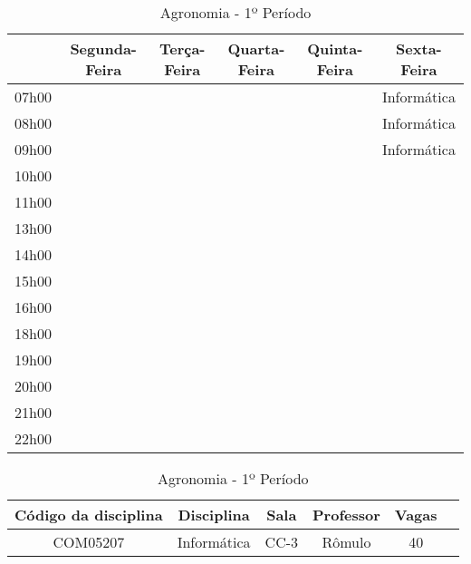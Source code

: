 \begin{apendices}
\begin{table}[!h]
\begin{adjustbox}{width=1\textwidth,center=\textwidth}
\centering
\begin{tabular}{|c|c|c|c|c|c|}
\hline
 & Segunda-Feira & Terça-Feira & Quarta-Feira & Quinta-Feira & Sexta-Feira \\ \hline
07h00 &  &  &  &  & Informática \\ \hline
08h00 &  &  &  &  & Informática \\ \hline
09h00 &  &  &  &  & Informática \\ \hline
10h00 &  &  &  &  &  \\ \hline
11h00 &  &  &  &  &  \\ \hline
13h00 &  &  &  &  &  \\ \hline
14h00 &  &  &  &  &  \\ \hline
15h00 &  &  &  &  &  \\ \hline
16h00 &  &  &  &  &  \\ \hline
18h00 &  &  &  &  &  \\ \hline
19h00 &  &  &  &  &  \\ \hline
20h00 &  &  &  &  &  \\ \hline
21h00 &  &  &  &  &  \\ \hline
22h00 &  &  &  &  &  \\ \hline

\end{tabular}
\end{adjustbox}
\begin{adjustbox}{width=1\textwidth,center=\textwidth}
\centering
\begin{tabular}{|c|c|c|c|c|c|}
\hline
\textbf{Código da disciplina} & \textbf{Disciplina} & \textbf{Sala} & \textbf{Professor} & \textbf{Vagas} \\ \hline
COM05207 & Informática & CC-3 & Rômulo & 40 \\ \hline

\end{tabular}
\end{adjustbox}
\caption{Agronomia - 1º Período}
\end{table}



\end{apendices}
